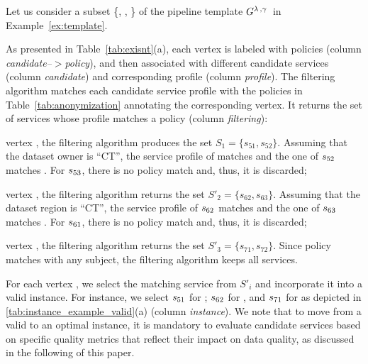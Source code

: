 
\begin{example}[\bf \pipelineInstance]\label{ex:instance}

Let us consider a subset \{, , \} of the pipeline template $G^{\lambda\,,\gamma\,}$ in Example~\ref{ex:template}.

As presented in Table~\ref{tab:exisnt}(a), each vertex is labeled with policies (column \emph{candidate--$>$policy}), and then associated with different candidate services (column \emph{candidate}) and corresponding profile (column \emph{profile}). The filtering algorithm matches each candidate service profile with the policies in Table~\ref{tab:anonymization} annotating the corresponding vertex. It returns the set of services whose profile matches a policy (column \emph{filtering}):
\begin{enumerate*}[label=\textit{\roman*})]
  \item vertex , the filtering algorithm produces the set $S_{1}=\{s_{51},s_{52}\}$. Assuming that the dataset owner is ``CT'', the service profile of  matches  and the one of $s_{52}$ matches . For $s_{53}$, there is no policy match and, thus, it is discarded;
  \item vertex , the filtering algorithm returns the set $S'_2=\{s_{62},s_{63}\}$. Assuming that the dataset region is ``CT'', the service profile of $s_{62}$ matches  and the one of $s_{63}$ matches . For $s_{61}$, there is no policy match and, thus, it is discarded;
  \item vertex , the filtering algorithm returns the set $S'_3=\{s_{71},s_{72}\}$. Since policy  matches with any subject, the filtering algorithm keeps all services.
\end{enumerate*}

For each vertex , we select the matching service  from $S'_i$ and incorporate it into a valid instance. For instance, we select $s_{51}$ for ; $s_{62}$ for , and $s_{71}$ for 
as depicted in \cref{tab:instance_example_valid}(a) (column \emph{instance}). We note that to move from a valid to an optimal instance, it is mandatory to evaluate candidate services based on specific quality metrics that reflect their impact on data quality, as discussed in the following of this paper.


\end{example}
